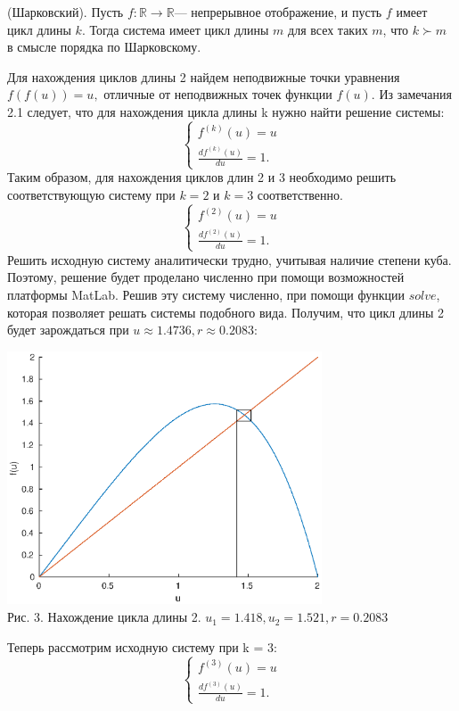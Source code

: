 \documentclass[11pt]{article}
\begin{document}
	\begin{theorem}
		{(Шарковский). Пусть $f: \mathds{R} \rightarrow \mathds{R}$--- непрерывное отображение, и пусть $f$ имеет цикл длины $k$. Тогда система имеет цикл длины $m$ для всех таких $m$, что $k \succ m$ в смысле порядка по Шарковскому.}
	\end{theorem}
	{Для нахождения циклов длины 2 найдем неподвижные точки уравнения $f(f(u)) = u,$ отличные от неподвижных точек функции $f(u)$.}
	\newline
	{Из замечания 2.1 следует, что для нахождения цикла длины k нужно найти решение системы:}
	\[ \begin{cases}
	f^{(k)}(u) = u\\
	\frac{df^{(k)}(u)}{du} = 1.
	\end{cases}\]
	{Таким образом, для нахождения циклов длин 2 и 3 необходимо решить соответствующую систему при $k = 2$ и $k = 3$ соответственно.}
	\[ \begin{cases}
	f^{(2)}(u) = u\\
	\frac{df^{(2)}(u)}{du} = 1.
	\end{cases}\]
	{Решить исходную систему аналитически трудно, учитывая наличие степени куба. Поэтому, решение будет проделано численно при помощи возможностей платформы MatLab. Решив эту систему численно, при помощи функции $solve$, которая позволяет решать системы подобного вида. Получим, что цикл длины 2 будет зарождаться при $u \approx 1.4736, r \approx 0.2083$:}
	\begin{center}
		\includegraphics[width=0.7\textwidth]{cicle_2.eps}\\
		{Рис. 3. Нахождение цикла длины 2. $u_1 = 1.418, u_2 = 1.521, r = 0.2083$}
	\end{center}
	{Теперь рассмотрим исходную систему при k = 3:}
	\[ \begin{cases}
	f^{(3)}(u) = u\\
	\frac{df^{(3)}(u)}{du} = 1.
	\end{cases}\]
\end{document}

